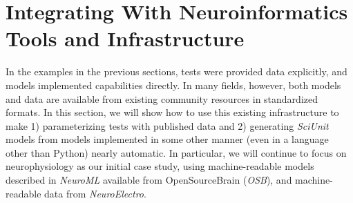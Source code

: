 \documentclass{frontiersSCNS}
\begin{document}
\section{Integrating With Neuroinformatics Tools and Infrastructure}\label{sec:neuronunit}
In the examples in the previous sections, tests were provided data explicitly, and models implemented capabilities directly. 
In many fields, however, both models and data are available from existing  community resources in standardized formats. 
In this section, we will show how to use this existing infrastructure to make 1) parameterizing tests with published data and 2) generating \textit{SciUnit} models from models implemented in some other manner (even in a language other than Python) nearly automatic. 
In particular, we will continue to focus on neurophysiology as our initial case study, using machine-readable models described in \textit{NeuroML} available from OpenSourceBrain (\textit{OSB}), and machine-readable data from \textit{NeuroElectro}. 
\end{document}
